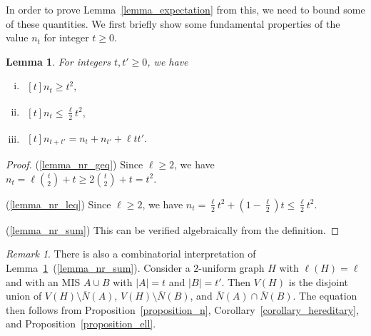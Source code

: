 \documentclass{article}
\theoremstyle{plain}
\theoremstyle{remark}
\newtheorem{remark}[theorem]{Remark}
\theoremstyle{plain}
\newtheorem{lemma}[theorem]{Lemma}
\numberwithin{equation}{section}
\begin{document}
	In order to prove Lemma~\ref{lemma_expectation} from this, we need to bound some of these quantities. We first briefly show some fundamental properties of the value $n_t$ for integer $t\geq0$.
	
	\begin{lemma}\label{lemma_nr}
		For integers $t,t'\geq0$, we have
		\begin{enumerate}[(i)]
			\item\label{lemma_nr_geq} $\begin{aligned}[t]
				n_t\geq t^2,
			\end{aligned}$
			\item\label{lemma_nr_leq} $\begin{aligned}[t]
				n_t\leq\tfrac{\ell}{2}t^2,
			\end{aligned}$
			\item\label{lemma_nr_sum} $\begin{aligned}[t]
				n_{t+t'}=n_t+n_{t'}+\ell tt'.
			\end{aligned}$
		\end{enumerate}
	\end{lemma}
	
	\begin{proof}
		(\ref{lemma_nr_geq}) Since $\ell\geq2$, we have $n_t=\ell\binom{t}{2}+t\geq2\binom{t}{2}+t=t^2$.
		
		(\ref{lemma_nr_leq}) Since $\ell\geq2$, we have $n_t=\tfrac{\ell}{2}t^2+(1-\tfrac{\ell}{2})t\leq\tfrac{\ell}{2}t^2$.
		
		(\ref{lemma_nr_sum}) This can be verified algebraically from the definition.
	\end{proof}
	
	\begin{remark}
		There is also a combinatorial interpretation of Lemma~\ref{lemma_nr}~(\ref{lemma_nr_sum}). Consider a $2$-uniform graph $H$ with $\ell(H)=\ell$ and with an MIS $A\cup B$ with $|A|=t$ and $|B|=t'$. Then $V(H)$ is the disjoint union of $V(H)\setminus\overline{N}(A)$, $V(H)\setminus\overline{N}(B)$, and $\overline{N}(A)\cap\overline{N}(B)$. The equation then follows from Proposition~\ref{proposition_n}, Corollary~\ref{corollary_hereditary}, and Proposition~\ref{proposition_ell}.
	\end{remark}
	
\end{document}
